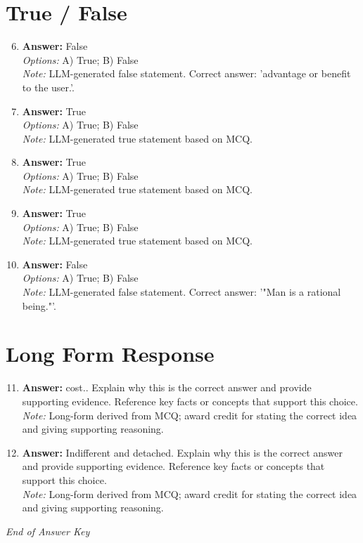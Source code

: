 \documentclass[12pt]{article}
\begin{document}
\section*{True / False}
\begin{enumerate}[label=\arabic*.]
\setcounter{enumi}{5}
\item \textbf{Answer:} False
\\ \textit{Options:} A) True; B) False
\\ \textit{Note:} LLM-generated false statement. Correct answer: 'advantage or benefit to the user.'.
\item \textbf{Answer:} True
\\ \textit{Options:} A) True; B) False
\\ \textit{Note:} LLM-generated true statement based on MCQ.
\item \textbf{Answer:} True
\\ \textit{Options:} A) True; B) False
\\ \textit{Note:} LLM-generated true statement based on MCQ.
\item \textbf{Answer:} True
\\ \textit{Options:} A) True; B) False
\\ \textit{Note:} LLM-generated true statement based on MCQ.
\item \textbf{Answer:} False
\\ \textit{Options:} A) True; B) False
\\ \textit{Note:} LLM-generated false statement. Correct answer: '"Man is a rational being."'.
\end{enumerate}

\section*{Long Form Response}
\begin{enumerate}[label=\arabic*.]
\setcounter{enumi}{10}
\item \textbf{Answer:} cost.. Explain why this is the correct answer and provide supporting evidence. Reference key facts or concepts that support this choice.
\\ \textit{Note:} Long-form derived from MCQ; award credit for stating the correct idea and giving supporting reasoning.
\item \textbf{Answer:} Indifferent and detached. Explain why this is the correct answer and provide supporting evidence. Reference key facts or concepts that support this choice.
\\ \textit{Note:} Long-form derived from MCQ; award credit for stating the correct idea and giving supporting reasoning.
\end{enumerate}

\vfill
\noindent\textit{End of Answer Key}
\end{document}
